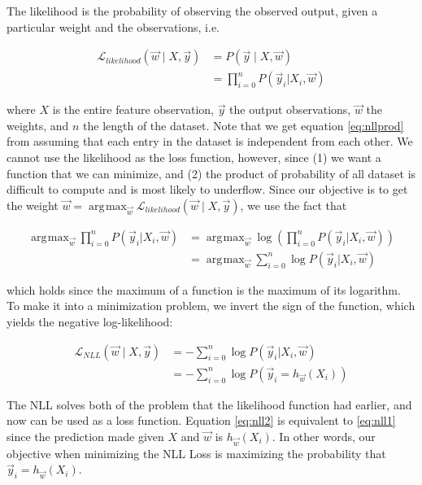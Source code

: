 \documentclass[12pt,a4paper,]{report}
\DeclareMathOperator*{\argmax}{arg\!\max}
\begin{document}
The likelihood is the probability of observing the observed output,
given a particular weight and the observations, i.e.

\begin{align}
    \mathcal{L}_{likelihood}(\vec{w} \mid X, \vec{y}) &= P(\vec{y} \mid X, \vec{w}) \\
    &= \prod_{i = 0}^{n} P(\vec{y}_i |  X_i, \vec{w}) \label{eq:nllprod}
\end{align}

where \(X\) is the entire feature observation, \(\vec{y}\) the output
observations, \(\vec{w}\) the weights, and \(n\) the length of the
dataset. Note that we get equation \ref{eq:nllprod} from assuming that
each entry in the dataset is independent from each other. We cannot use
the likelihood as the loss function, however, since (1) we want a
function that we can minimize, and (2) the product of probability of all
dataset is difficult to compute and is most likely to underflow. Since
our objective is to get the weight
\(\vec{w} = \displaystyle \argmax_{\vec{w}} \mathcal{L}_{likelihood}(\vec{w} \mid X, \vec{y})\),
we use the fact that

\begin{align}
    \argmax_{\vec{w}} \prod_{i = 0}^{n} P(\vec{y}_i |  X_i, \vec{w}) 
    &= \argmax_{\vec{w}} \log (\prod_{i = 0}^{n} P(\vec{y}_i |  X_i, \vec{w})) \\
    &= \argmax_{\vec{w}} \sum_{i = 0}^{n} \log P(\vec{y}_i |  X_i, \vec{w})
\end{align}

which holds since the maximum of a function is the maximum of its
logarithm. To make it into a minimization problem, we invert the sign of
the function, which yields the negative log-likelihood:

\begin{align}
    \mathcal{L}_{NLL}(\vec{w} \mid X, \vec{y}) &= - \sum_{i = 0}^{n} \log P(\vec{y}_i |  X_i, \vec{w}) \label{eq:nll1} \\
    &= - \sum_{i = 0}^{n} \log P(\vec{y}_i = h_{\vec{w}}(X_i)) \label{eq:nll2}
\end{align}

The NLL solves both of the problem that the likelihood function had
earlier, and now can be used as a loss function. Equation \ref{eq:nll2}
is equivalent to \ref{eq:nll1} since the prediction made given \(X\) and
\(\vec{w}\) is \(h_{\vec{w}}(X_i)\). In other words, our objective when
minimizing the NLL Loss is maximizing the probability that
\(\vec{y}_i = h_{\vec{w}}(X_i)\).
\end{document}

